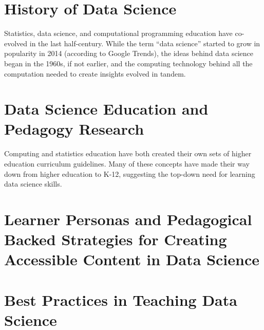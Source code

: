 \documentclass[../main.tex]{subfiles}
\begin{document}
    

    \section{History of Data Science}
        \label{se:intro-ds-history}

        Statistics, data science, and computational programming education
        have co-evolved in the last half-century.
        While the term ``data science'' started to grow in popularity in 2014
        (according to Google Trends),
        the ideas behind data science began in the 1960s, if not earlier,
        and the computing technology behind all the computation needed
        to create insights evolved in tandem.

        
        
        
        
        

    \section{Data Science Education and Pedagogy Research}
        \label{se:intro-ds-edu-ped}

        Computing and statistics education have both created their own sets of
        higher education curriculum guidelines.
        Many of these concepts have made their way down from higher education to K-12,
        suggesting the top-down need for learning data science skills.

        
        
        

    \section{Learner Personas and Pedagogical Backed Strategies for Creating Accessible Content in Data Science}
        \label{se:intro-personas}

        

    \section{Best Practices in Teaching Data Science}
        \label{se:intro-teaching-best-practices-ds}

        
\end{document}
